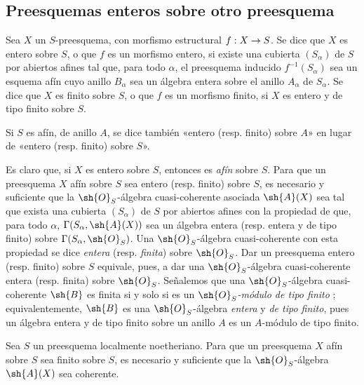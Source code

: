 \documentclass[oneside,10pt]{amsart}
\makeatletter
\newcommand{\ega@arrow}[2]{\mathchoice{#1}{#2}{#2}{#2}}
\renewcommand{\to}{\ega@arrow{\longrightarrow}{\rightarrow}}
\let\EGAOriginalLabel\label
\renewcommand{\label}[1]{\phantomsection\EGAOriginalLabel{#1}}
\makeatother
\begin{document}
\subsection{Preesquemas enteros sobre otro preesquema}
\label{subsection:II.6.1}

\begin{definition}[6.1.1]
\label{II.6.1.1}
Sea $X$ un $S$-preesquema, con morfismo estructural $f:X\to S$.
Se dice que $X$ es entero sobre $S$, o que $f$ es un morfismo entero, si existe una cubierta $(S_\alpha)$ de $S$ por abiertos afines tal que, para todo $\alpha$, el preesquema inducido $f^{-1}(S_\alpha)$ sea un esquema afín cuyo anillo $B_\alpha$ sea un álgebra entera sobre el anillo $A_\alpha$ de $S_\alpha$.
Se dice que $X$ es finito sobre $S$, o que $f$ es un morfismo finito, si $X$ es entero y de tipo finito sobre $S$.
\end{definition}

Si $S$ es afín, de anillo $A$, se dice también «entero (resp. finito) sobre $A$» en lugar de «entero (resp. finito) sobre $S$».

\begin{env}[6.1.2]
\label{II.6.1.2}
Es claro que, si $X$ es entero sobre $S$, entonces es \emph{afín} sobre $S$.
Para que un preesquema $X$ afín sobre $S$ sea entero (resp. finito) sobre $S$, es necesario y suficiente que la $\sh{O}_S$-álgebra cuasi-coherente asociada $\sh{A}(X)$ sea tal que exista una cubierta $(S_\alpha)$ de $S$ por abiertos afines con la propiedad de que, para todo $\alpha$, $\Gamma(S_\alpha,\sh{A}(X))$ sea un álgebra entera (resp. entera y de tipo finito) sobre $\Gamma(S_\alpha,\sh{O}_S)$.
Una $\sh{O}_S$-álgebra cuasi-coherente con esta propiedad se dice \emph{entera} (resp. \emph{finita}) sobre $\sh{O}_S$.
Dar un preesquema entero (resp. finito) sobre $S$ equivale, pues,  a dar una $\sh{O}_S$-álgebra cuasi-coherente entera (resp. finita) sobre $\sh{O}_S$.
Señalemos que una $\sh{O}_S$-álgebra cuasi-coherente $\sh{B}$ es finita si y solo si es un \emph{$\sh{O}_S$-módulo de tipo finito} ;
equivalentemente, $\sh{B}$ es una $\sh{O}_S$-álgebra \emph{entera} y \emph{de tipo finito}, pues un álgebra entera y de tipo finito sobre un anillo $A$ es un $A$-módulo de tipo finito.
\end{env}

\begin{proposition}[6.1.3]
\label{II.6.1.3}
Sea $S$ un preesquema localmente noetheriano.
Para que un preesquema $X$ afín sobre $S$ sea finito sobre $S$, es necesario y suficiente que la $\sh{O}_S$-álgebra $\sh{A}(X)$ sea coherente.
\end{proposition}
\end{document}
